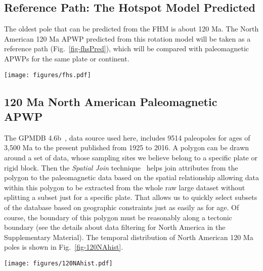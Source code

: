 \subsection{Reference Path: The Hotspot Model Predicted}

The oldest pole that can be predicted from the FHM is about 120 Ma. The North
American 120 Ma APWP predicted from this rotation model will be
taken as a reference path (Fig.~\ref{fig-fhsPred}), which will be compared with
paleomagnetic APWPs for the same plate or continent.

\begin{figure*}
\centering
\texttt{[image: figures/fhs.pdf]}
\caption[120 Ma FHS model predicted APWP of North America]{FHM
predicted 120 Ma APWP for $NAC$. Its age step is 5
Myr.}\label{fig-fhsPred}
\end{figure*}

\subsection{120 Ma North American Paleomagnetic APWP}

The GPMDB 4.6b~\cite{P05}, data source used here, includes 9514 paleopoles for
ages of 3,500 Ma to the present published from 1925 to 2016. A polygon
can be drawn around a set of data, whose sampling sites we believe belong to a
specific plate or rigid block. Then the {\em Spatial Join\/}
technique~\cite{J07} helps join attributes from the polygon to the paleomagnetic
data based on the spatial relationship allowing data within this polygon to be
extracted from the whole raw large dataset without splitting a subset just for a
specific plate. That allows us to quickly select subsets of the database based
on geographic constraints just as easily as for age. Of course, the boundary of
this polygon must be reasonably along a tectonic boundary (see the details
about data filtering for North America in the Supplementary Material). The
temporal distribution of North American 120 Ma poles is shown in
Fig.~\ref{fig-120NAhist}.

\begin{figure*}
\centering
\texttt{[image: figures/120NAhist.pdf]}
\caption[Distribution of 120 Ma North American poles]{Temporal
distribution 120 Ma $NAC$ paleomagnetic poles. For distribution a,
each bin only counts in the midpoints of pole error bars; For distribution b, as
long as the bar intersects with the bin, it is counted in.
}\label{fig-120NAhist}
\end{figure*}

